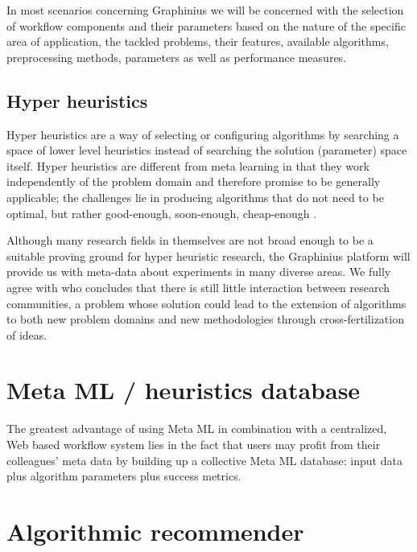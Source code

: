 In most scenarios concerning Graphinius we will be concerned with the selection of workflow components and their parameters based on the nature of the specific area of application, the tackled problems, their features, available algorithms, preprocessing methods, parameters as well as performance measures.

\subsection{Hyper heuristics}
\label{ssect:hyper_heuristics}

Hyper heuristics are a way of selecting or configuring algorithms by searching a space of lower level heuristics instead of searching the solution (parameter) space itself. Hyper heuristics are different from meta learning in that they work independently of the problem domain and therefore promise to be generally applicable; the challenges lie in producing algorithms that do not need to be optimal, but rather good-enough, soon-enough, cheap-enough \citep{Burke:2003:Hyperheuristics}.

Although many research fields in themselves are not broad enough to be a suitable proving ground for hyper heuristic research, the Graphinius platform will provide us with meta-data about experiments in many diverse areas. We fully agree with \cite{Burke2013} who concludes that there is still little interaction between research communities, a problem whose solution could lead to the extension of algorithms to both new problem domains and new methodologies through cross-fertilization of ideas.


\section{Meta ML / heuristics database}
\label{sect:heuristics}

The greatest advantage of using Meta ML in combination with a centralized, Web based workflow system lies in the fact that users may profit from their colleagues' meta data by building up a collective Meta ML database: input data plus algorithm parameters plus success metrics.


\section{Algorithmic recommender}
\label{sect:algo_recommender}
